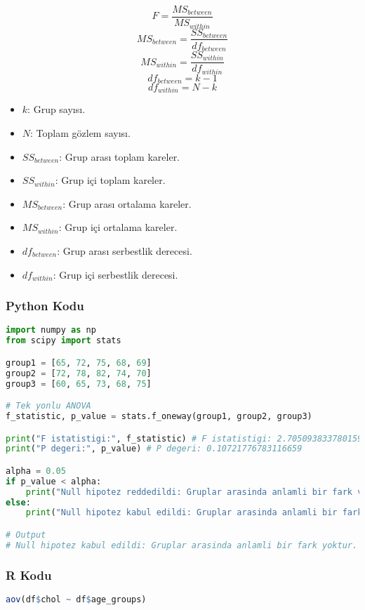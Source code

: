 \[ F = \frac{MS_{between}}{MS_{within}} \]
\[ MS_{between} = \frac{SS_{between}}{df_{between}} \]
\[ MS_{within} = \frac{SS_{within}}{df_{within}} \]
\[ df_{between} = k - 1 \]
\[ df_{within} = N - k \]

\begin{itemize}
	\item $k$: Grup sayısı.
	\item $N$: Toplam gözlem sayısı.
	\item $SS_{between}$: Grup arası toplam kareler.
	\item $SS_{within}$: Grup içi toplam kareler.
	\item $MS_{between}$: Grup arası ortalama kareler.
	\item $MS_{within}$: Grup içi ortalama kareler.
	\item $df_{between}$: Grup arası serbestlik derecesi.
	\item $df_{within}$: Grup içi serbestlik derecesi.
\end{itemize}

\subsubsection{Python Kodu}

\begin{lstlisting}[language=Python]
import numpy as np
from scipy import stats

group1 = [65, 72, 75, 68, 69]
group2 = [72, 78, 82, 74, 70]
group3 = [60, 65, 73, 68, 75]

# Tek yonlu ANOVA 
f_statistic, p_value = stats.f_oneway(group1, group2, group3)

print("F istatistigi:", f_statistic) # F istatistigi: 2.7050938337801593
print("P degeri:", p_value) # P degeri: 0.10721776783116659

alpha = 0.05
if p_value < alpha:
    print("Null hipotez reddedildi: Gruplar arasinda anlamli bir fark vardir.")
else:
    print("Null hipotez kabul edildi: Gruplar arasinda anlamli bir fark yoktur.")

# Output
# Null hipotez kabul edildi: Gruplar arasinda anlamli bir fark yoktur.
\end{lstlisting}

\subsubsection{R Kodu}

\begin{lstlisting}[language=R]
aov(df$chol ~ df$age_groups)
\end{lstlisting}

